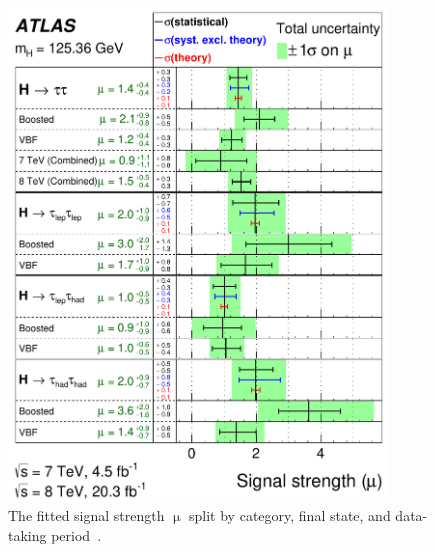 \begin{figure}[tp]
  \centering
  \includegraphics[width=0.90\textwidth]{figures/HIGG-2013-32/fig_09}
  \caption{The fitted signal strength $\upmu$ split by category, final state, and data-taking period~\cite{HIGG-2013-32}.}
  \label{fig:results-musummary}
\end{figure}

